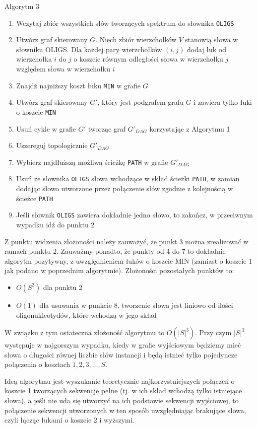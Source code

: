 \documentclass[a4paper,10pt]{article}
\begin{document}
Algorytm 3
\begin{enumerate}
 \item Wczytaj zbiór wszystkich słów tworzących spektrum do słownika \texttt{OLIGS}
 \item Utwórz graf skierowany $G$. Niech zbiór wierzchołków $V$ stanowią słowa w słowniku OLIGS. Dla każdej pary wierzchołków $(i,j)$ dodaj 
       łuk od wierzchołka $i$ do $j$ o koszcie równym odległości słowa w wierzchołku $j$ względem słowa w wierzchołku $i$
 \item Znajdź najniższy koszt łuku \texttt{MIN} w grafie $G$
 \item Utwórz graf skierowany $G'$, który jest podgrafem grafu $G$ i zawiera tylko łuki o koszcie \texttt{MIN}
 \item Usuń cykle w grafie $G'$ tworząc graf $G'_{DAG}$ korzystając z Algorytmu 1
 \item Uszereguj topologicznie $G'_{DAG}$
 \item Wybierz najdłuższą możliwą ścieżkę \texttt{PATH} w grafie $G'_{DAG}$
 \item Usuń ze słownika \texttt{OLIGS} słowa wchodzące w skład ścieżki \texttt{PATH}, w zamian dodając słowo utworzone przez połączenie słów zgodnie z kolejnością w ścieżce \texttt{PATH}
 \item Jeśli słownik \texttt{OLIGS} zawiera dokładnie jedno słowo, to zakończ, w przeciwnym wypadku idź do punktu 2
\end{enumerate}

Z punktu widzenia złożoności należy zauważyć, że punkt 3 można zrealizować w ramach punktu 2. Zauważmy ponadto, że punkty od 4 do 7 to dokładnie algorytm pozytywny, 
z uwzględnieniem łuków o koszcie MIN (zamiast o koszcie 1 jak podano w poprzednim algorytmie). Złożoności pozostałych punktów to:
\begin{itemize}
 \item $O(S^2)$ dla punktu 2
 \item $O(1)$ dla usuwania w punkcie 8, tworzenie słowa jest liniowo od ilości oligonukleotydów, które wchodzą w jego skład
\end{itemize}
W związku z tym ostateczna złożoność algorytmu to $O(|S|^3)$. Przy czym $|S|^3$ występuje w najgorszym wypadku, 
kiedy w grafie wyjściowym będziemy mieć słowa o długości równej liczbie słów instancji i będą istnieć tylko pojedyncze połączenia o kosztach $1, 2, 3, ..., S$.

Ideą algorytmu jest wyszukanie teoretycznie najkorzystniejszych połączeń o koszcie 1 tworzących sekwencje 
pełne (tj. w ich skład wchodzą tylko istniejące słowa), a jeśli nie uda się utworzyć na ich podstawie sekwencji wyjściowej, 
to połączenie sekwencji utworzonych w ten sposób uwzględniając brakujące słowa, czyli łącząc łukami o koszcie 2 i wyższymi. 
\end{document}
